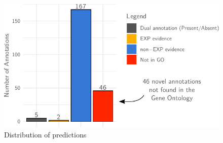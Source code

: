 \documentclass[aspectratio=169,9pt,handout]{beamer}
\begin{document}
\begin{frame}[c,label=aphylo-table]
\begin{minipage}[m]{.44\linewidth}
		
	\end{minipage}
	
	
	
\end{frame}

\begin{frame}[c,label=aphylo-200funs]
	\begin{figure}
		\includegraphics[width=.6\linewidth]{aphylo-results.pdf}
		\caption{Distribution of predictions}
	\end{figure}
	\vfill\hfill\hyperlink{aphylo-results-overview}{}
\end{frame}
\end{document}
